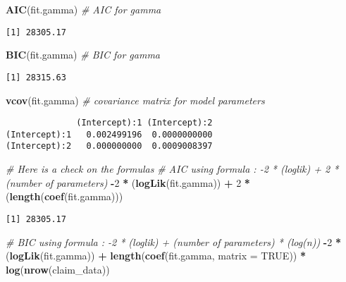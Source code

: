 \documentclass[]{book}
\newenvironment{Shaded}{\begin{snugshade}}{\end{snugshade}}
\newcommand{\KeywordTok}[1]{\textcolor[rgb]{0.13,0.29,0.53}{\textbf{#1}}}
\newcommand{\DataTypeTok}[1]{\textcolor[rgb]{0.13,0.29,0.53}{#1}}
\newcommand{\DecValTok}[1]{\textcolor[rgb]{0.00,0.00,0.81}{#1}}
\newcommand{\StringTok}[1]{\textcolor[rgb]{0.31,0.60,0.02}{#1}}
\newcommand{\CommentTok}[1]{\textcolor[rgb]{0.56,0.35,0.01}{\textit{#1}}}
\newcommand{\OtherTok}[1]{\textcolor[rgb]{0.56,0.35,0.01}{#1}}
\newcommand{\OperatorTok}[1]{\textcolor[rgb]{0.81,0.36,0.00}{\textbf{#1}}}
\newcommand{\NormalTok}[1]{#1}
\theoremstyle{definition}
\theoremstyle{definition}
\theoremstyle{definition}
\theoremstyle{remark}
\begin{document}
\begin{Shaded}
\begin{Highlighting}[]
\KeywordTok{AIC}\NormalTok{(fit.gamma)                    }\CommentTok{# AIC for gamma}
\end{Highlighting}
\end{Shaded}

\begin{verbatim}
[1] 28305.17
\end{verbatim}

\begin{Shaded}
\begin{Highlighting}[]
\KeywordTok{BIC}\NormalTok{(fit.gamma)                    }\CommentTok{# BIC for gamma}
\end{Highlighting}
\end{Shaded}

\begin{verbatim}
[1] 28315.63
\end{verbatim}

\begin{Shaded}
\begin{Highlighting}[]
\KeywordTok{vcov}\NormalTok{(fit.gamma)                   }\CommentTok{# covariance matrix for model parameters }
\end{Highlighting}
\end{Shaded}

\begin{verbatim}
              (Intercept):1 (Intercept):2
(Intercept):1   0.002499196  0.0000000000
(Intercept):2   0.000000000  0.0009008397
\end{verbatim}

\begin{Shaded}
\begin{Highlighting}[]
\CommentTok{# Here is a check on the formulas}
\CommentTok{# AIC using formula : -2 * (loglik) + 2 * (number of parameters)}
\OperatorTok{-}\DecValTok{2} \OperatorTok{*}\StringTok{ }\NormalTok{(}\KeywordTok{logLik}\NormalTok{(fit.gamma)) }\OperatorTok{+}\StringTok{ }\DecValTok{2} \OperatorTok{*}\StringTok{ }\NormalTok{(}\KeywordTok{length}\NormalTok{(}\KeywordTok{coef}\NormalTok{(fit.gamma)))}
\end{Highlighting}
\end{Shaded}

\begin{verbatim}
[1] 28305.17
\end{verbatim}

\begin{Shaded}
\begin{Highlighting}[]
\CommentTok{# BIC using formula : -2 * (loglik) + (number of parameters) * (log(n))}
\OperatorTok{-}\DecValTok{2} \OperatorTok{*}\StringTok{ }\NormalTok{(}\KeywordTok{logLik}\NormalTok{(fit.gamma)) }\OperatorTok{+}\StringTok{ }\KeywordTok{length}\NormalTok{(}\KeywordTok{coef}\NormalTok{(fit.gamma, }\DataTypeTok{matrix =} \OtherTok{TRUE}\NormalTok{)) }\OperatorTok{*}\StringTok{ }\KeywordTok{log}\NormalTok{(}\KeywordTok{nrow}\NormalTok{(claim_data))}
\end{Highlighting}
\end{Shaded}
\end{document}

